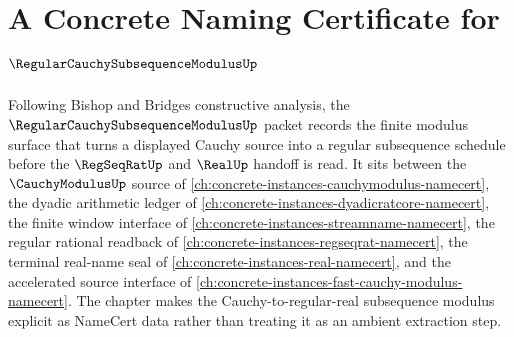 \chapter{A Concrete Naming Certificate for $\RegularCauchySubsequenceModulusUp$}
\label{ch:concrete-instances-regular-cauchy-subsequence-modulus-namecert}

Following Bishop and Bridges constructive analysis, the $\RegularCauchySubsequenceModulusUp$ packet records the finite modulus surface that turns a displayed Cauchy source into a regular subsequence schedule before the $\RegSeqRatUp$ and $\RealUp$ handoff is read. It sits between the $\CauchyModulusUp$ source of \autoref{ch:concrete-instances-cauchymodulus-namecert}, the dyadic arithmetic ledger of \autoref{ch:concrete-instances-dyadicratcore-namecert}, the finite window interface of \autoref{ch:concrete-instances-streamname-namecert}, the regular rational readback of \autoref{ch:concrete-instances-regseqrat-namecert}, the terminal real-name seal of \autoref{ch:concrete-instances-real-namecert}, and the accelerated source interface of \autoref{ch:concrete-instances-fast-cauchy-modulus-namecert}. The chapter makes the Cauchy-to-regular-real subsequence modulus explicit as NameCert data rather than treating it as an ambient extraction step.

